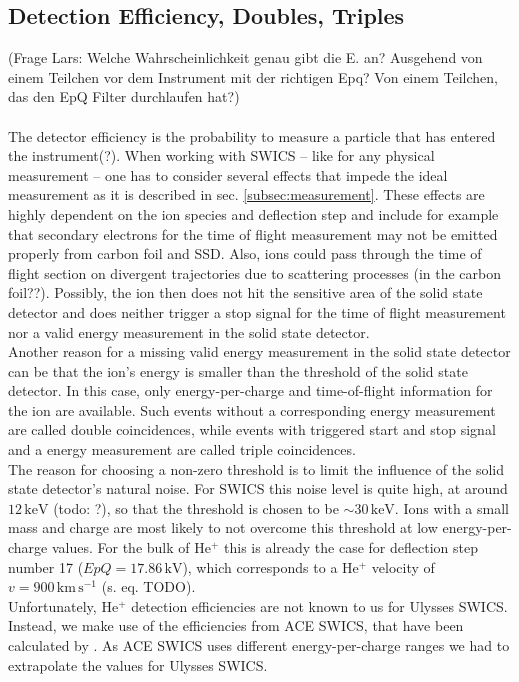 \subsection{Detection Efficiency, Doubles, Triples}
(Frage Lars: Welche Wahrscheinlichkeit genau gibt die E. an? Ausgehend von einem Teilchen vor dem Instrument mit der richtigen Epq? Von einem Teilchen, das den EpQ Filter durchlaufen hat?)\\ \\
The detector efficiency is the probability to measure a particle that has entered the instrument(?). 
When working with SWICS -- like for any physical measurement -- one has to consider several effects that impede the ideal measurement as it is described in sec. \ref{subsec:measurement}. 
These effects are highly dependent on the ion species and deflection step and include for example that secondary electrons for the time of flight measurement may not be emitted properly from carbon foil and SSD. Also, ions could pass through the time of flight section on divergent trajectories due to scattering processes (in the carbon foil??). Possibly, the ion then does not hit the sensitive area of the solid state detector and does neither trigger a stop signal for the time of flight measurement nor a valid energy measurement in the solid state detector.\\
Another reason for a missing valid energy measurement in the solid state detector can be that the ion's energy is smaller than the threshold of the solid state detector. In this case, only energy-per-charge and time-of-flight information for the ion are available. Such events without a corresponding energy measurement are called double coincidences, while events with triggered start and stop signal and a energy measurement are called triple coincidences.\\
The reason for choosing a non-zero threshold is to limit the influence of the solid state detector's natural noise. For SWICS this noise level is quite high, at around $12\,\mathrm{keV}$ \citep{gloeckler_1992} (todo: ?), so that the threshold is chosen to be $\sim 30 \, \mathrm{keV}$. Ions with a small mass and charge are most likely to not overcome this threshold at low energy-per-charge values. For the bulk of $\mathrm{He^{+}}$ this is already the case for deflection step number 17 ($EpQ = 17.86\,\mathrm{kV}$), which corresponds to a $\mathrm{He^{+}}$ velocity of $v = 900\,\mathrm{km\,s^{-1}}$ (s. eq. TODO).\\
Unfortunately, $\mathrm{He^{+}}$ detection efficiencies are not known to us for Ulysses SWICS. Instead, we make use of the efficiencies from ACE SWICS, that have been calculated by \citet{koeten}. As ACE SWICS uses different energy-per-charge ranges we had to extrapolate the values for Ulysses SWICS.
